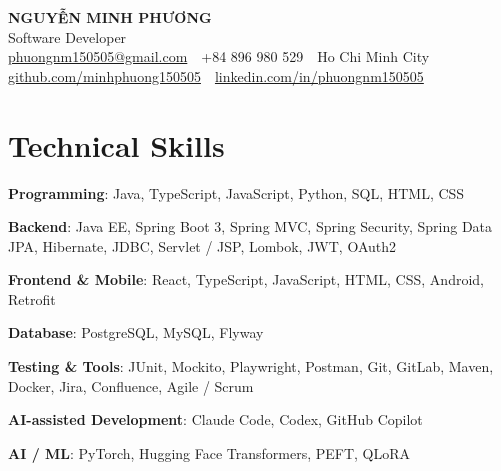 \documentclass[10pt, a4paper]{article}
\newcommand{\skillrow}[2]{\textbf{#1}: #2\par}
\begin{document}
\color{BodyText}

\begin{center}
  {\fontsize{21pt}{25pt}\selectfont\bfseries\color{NavyBlue} NGUYỄN MINH PHƯƠNG}\\[3pt]
  {\fontsize{12.5pt}{15pt}\selectfont\color{MutedText} Software Developer}\\[4pt]
  {\footnotesize
  \href{mailto:phuongnm150505@gmail.com}{phuongnm150505@gmail.com}
  \,\textbar\, +84 896 980 529
  \,\textbar\, Ho Chi Minh City
  \,\textbar\, \href{https://github.com/minhphuong150505}{github.com/minhphuong150505}
  \,\textbar\, \href{https://www.linkedin.com/in/phuongnm150505/}{linkedin.com/in/phuongnm150505}}
\end{center}
\vspace{-6pt}

\section{Technical Skills}
\skillrow{Programming}{Java, TypeScript, JavaScript, Python, SQL, HTML, CSS}
\skillrow{Backend}{Java EE, Spring Boot 3, Spring MVC, Spring Security, Spring Data JPA, Hibernate, JDBC, Servlet / JSP, Lombok, JWT, OAuth2}
\skillrow{Frontend \& Mobile}{React, TypeScript, JavaScript, HTML, CSS, Android, Retrofit}
\skillrow{Database}{PostgreSQL, MySQL, Flyway}
\skillrow{Testing \& Tools}{JUnit, Mockito, Playwright, Postman, Git, GitLab, Maven, Docker, Jira, Confluence, Agile / Scrum}
\skillrow{AI-assisted Development}{Claude Code, Codex, GitHub Copilot}
\skillrow{AI / ML}{PyTorch, Hugging Face Transformers, PEFT, QLoRA}

\end{document}
